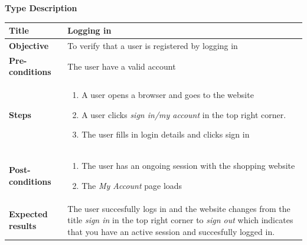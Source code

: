 \documentclass[UKenglish,12pt]{article}
\begin{document}
\begin{enumerate}
\textbf{\hspace{0.3cm}Type\hspace{4.4cm} Description}
\newline \vspace{0.2cm}
\begin{tabular}{| p{5cm} | p{10cm} | }
	\hline
	 \textbf{Title} & Logging in\\ \hline
	 \textbf{Objective} & To verify that a user is registered by logging in\\ \hline
	 \textbf{Pre-conditions} & The user have a valid account\\ \hline
	 \textbf{Steps} & \begin{enumerate} \item A user opens a browser and goes to the website \item A user clicks \textit{sign in/my account} in the top right corner. \item The user fills in login details and clicks sign in \end{enumerate} \\ \hline
	 \textbf{Post-conditions} & \begin{enumerate} \item The user has an ongoing session with the shopping website \item The \textit{My Account} page loads \end{enumerate} \\ \hline
	 \textbf{Expected results} &  The user succesfully logs in and the website changes from the title \textit{sign in} in the top right corner to \textit{sign out} which indicates that you have an active session and succesfully logged in.\\ 
	 \hline
\end{tabular} %



\end{enumerate}
\end{document}
